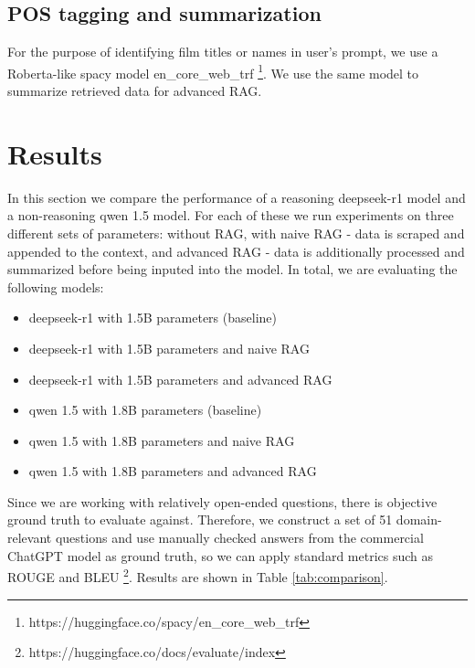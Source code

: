 \documentclass[fleqn,moreauthors,10pt]{ds_report}
\begin{document}
\subsection*{POS tagging and summarization}

For the purpose of identifying film titles or names in user's prompt, we use a Roberta-like spacy model en\_core\_web\_trf \footnote{https://huggingface.co/spacy/en\_core\_web\_trf}. We use the same model to summarize retrieved data for advanced RAG.  



\section*{Results}

In this section we compare the performance of a reasoning deepseek-r1 model and a non-reasoning qwen 1.5 model. For each of these we run experiments on three different sets of parameters: without RAG, with naive RAG - data is scraped and appended to the context, and advanced RAG - data is additionally processed and summarized before being inputed into the model. In total, we are evaluating the following models:
\begin{itemize}
	\item deepseek-r1 with 1.5B parameters (baseline)
	\item deepseek-r1 with 1.5B parameters and naive RAG
	\item deepseek-r1 with 1.5B parameters and advanced RAG
	\item qwen 1.5 with 1.8B parameters (baseline)
	\item qwen 1.5 with 1.8B parameters and naive RAG
	\item qwen 1.5 with 1.8B parameters and advanced RAG
\end{itemize}

Since we are working with relatively open-ended questions, there is objective ground truth to evaluate against. Therefore, we construct a set of 51 domain-relevant questions and use manually checked answers from the commercial ChatGPT model as ground truth, so we can apply standard metrics such as ROUGE and BLEU \footnote{https://huggingface.co/docs/evaluate/index}. Results are shown in Table \ref{tab:comparison}.
\end{document}
